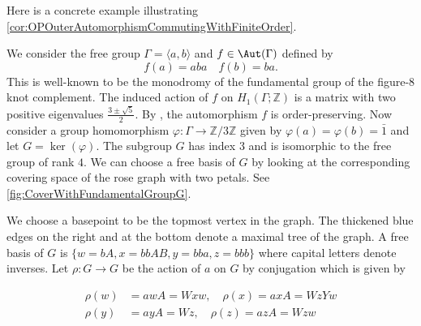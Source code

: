 \documentclass{amsart}
\begin{document}
Here is a concrete example illustrating \cref{cor:OPOuterAutomorphismCommutingWithFiniteOrder}.

\begin{example}
    We consider the free group $\Gamma = \langle a,b \rangle$  and $f\in \Aut(\Gamma)$ defined by 
    \[f(a) = aba \quad f(b) =ba.\] 
    This is well-known to be the monodromy of the fundamental group of the figure-8 knot complement. The induced action of $f$ on $H_1(\Gamma;\mathbb{Z})$ is a matrix with two positive eigenvalues $\frac{3\pm \sqrt{5}}{2}$. By \cite[Theorem 2.6]{PerronRolfsen03}, the automorphism $f$ is order-preserving. Now consider a group homomorphism $\varphi:\Gamma \to \mathbb{Z}/3\mathbb{Z}$ given by $\varphi(a) = \varphi(b) = \bar{1}$ and let $G= \ker(\varphi)$. The subgroup $G$ has index 3 and is isomorphic to the free group of rank $4$. We can choose a free basis of $G$ by looking at the corresponding covering space of the rose graph with two petals. See \cref{fig:CoverWithFundamentalGroupG}.

    We choose a basepoint to be the topmost vertex in the graph. The thickened blue edges on the right and at the bottom denote a maximal tree of the graph. A free basis of $G$ is $\{w = bA, x = bbAB, y= bba,z=bbb\}$ where capital letters denote inverses. Let $\rho:G\to G$ be the action of $a$ on $G$ by conjugation which is given by
    
    \begin{align*}
    \rho(w) &= awA = Wxw, \quad\rho(x) = axA = WzYw\\
    \rho(y) &= ayA = Wz,
    \quad\rho(z) = azA = Wzw
    \end{align*}
    
    \begin{center}
    \begin{figure}[h!]
\end{figure}
\end{center}
\end{example}
\end{document}
